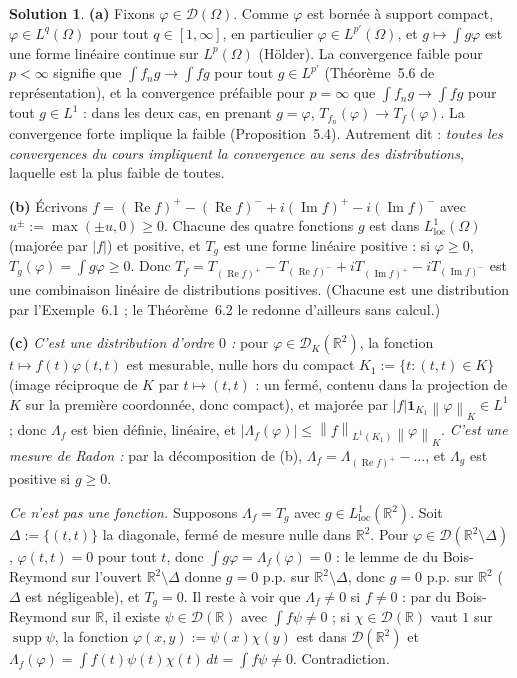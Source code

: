 \documentclass[11pt,a4paper]{article}
\newcommand{\R}{\mathbb{R}}
\newcommand{\norm}[1]{\left\|#1\right\|}
\DeclareMathOperator{\supp}{supp}
\newcommand{\D}{\mathcal{D}}
\renewcommand{\Re}{\operatorname{Re}}
\renewcommand{\Im}{\operatorname{Im}}
\theoremstyle{definition}
\newtheorem*{solution}{Solution}
\begin{document}
\begin{solution}
\noindent\textbf{(a)} Fixons $\varphi\in\D(\Omega)$. Comme $\varphi$ est bornée à support compact, $\varphi\in L^q(\Omega)$ pour tout $q\in[1,\infty]$, en particulier $\varphi\in L^{p'}(\Omega)$, et $g\mapsto\int g\varphi$ est une forme linéaire continue sur $L^p(\Omega)$ (Hölder). La convergence faible pour $p<\infty$ signifie que $\int f_n g\to\int fg$ pour tout $g\in L^{p'}$ (Théorème~5.6 de représentation), et la convergence préfaible pour $p=\infty$ que $\int f_ng\to\int fg$ pour tout $g\in L^1$ : dans les deux cas, en prenant $g=\varphi$, $T_{f_n}(\varphi)\to T_f(\varphi)$. La convergence forte implique la faible (Proposition~5.4). Autrement dit : \emph{toutes les convergences du cours impliquent la convergence au sens des distributions}, laquelle est la plus faible de toutes.

\medskip
\noindent\textbf{(b)} Écrivons $f=(\Re f)^+-(\Re f)^-+i(\Im f)^+-i(\Im f)^-$ avec $u^\pm:=\max(\pm u,0)\ge0$. Chacune des quatre fonctions $g$ est dans $L^1_{\mathrm{loc}}(\Omega)$ (majorée par $|f|$) et positive, et $T_g$ est une forme linéaire positive : si $\varphi\ge0$, $T_g(\varphi)=\int g\varphi\ge0$. Donc $T_f=T_{(\Re f)^+}-T_{(\Re f)^-}+iT_{(\Im f)^+}-iT_{(\Im f)^-}$ est une combinaison linéaire de distributions positives. (Chacune est une distribution par l'Exemple~6.1 ; le Théorème~6.2 le redonne d'ailleurs sans calcul.)

\medskip
\noindent\textbf{(c)} \emph{C'est une distribution d'ordre $0$ :} pour $\varphi\in\D_K(\R^2)$, la fonction $t\mapsto f(t)\varphi(t,t)$ est mesurable, nulle hors du compact $K_1:=\{t:(t,t)\in K\}$ (image réciproque de $K$ par $t\mapsto(t,t)$ : un fermé, contenu dans la projection de $K$ sur la première coordonnée, donc compact), et majorée par $|f|\mathbf 1_{K_1}\norm\varphi_K\in L^1$ ; donc $\Lambda_f$ est bien définie, linéaire, et $|\Lambda_f(\varphi)|\le\norm f_{L^1(K_1)}\norm\varphi_K$. \emph{C'est une mesure de Radon :} par la décomposition de (b), $\Lambda_f=\Lambda_{(\Re f)^+}-\dots$, et $\Lambda_g$ est positive si $g\ge0$.

\emph{Ce n'est pas une fonction.} Supposons $\Lambda_f=T_g$ avec $g\in L^1_{\mathrm{loc}}(\R^2)$. Soit $\Delta:=\{(t,t)\}$ la diagonale, fermé de mesure nulle dans $\R^2$. Pour $\varphi\in\D(\R^2\setminus\Delta)$, $\varphi(t,t)=0$ pour tout $t$, donc $\int g\varphi=\Lambda_f(\varphi)=0$ : le lemme de du Bois-Reymond sur l'ouvert $\R^2\setminus\Delta$ donne $g=0$ p.p. sur $\R^2\setminus\Delta$, donc $g=0$ p.p. sur $\R^2$ ($\Delta$ est négligeable), et $T_g=0$. Il reste à voir que $\Lambda_f\ne0$ si $f\ne0$ : par du Bois-Reymond sur $\R$, il existe $\psi\in\D(\R)$ avec $\int f\psi\ne0$ ; si $\chi\in\D(\R)$ vaut $1$ sur $\supp\psi$, la fonction $\varphi(x,y):=\psi(x)\chi(y)$ est dans $\D(\R^2)$ et $\Lambda_f(\varphi)=\int f(t)\psi(t)\chi(t)\,dt=\int f\psi\ne0$. Contradiction.
\end{solution}
\end{document}
